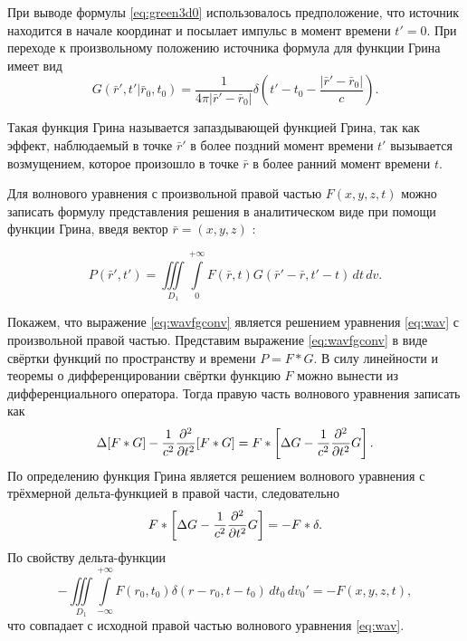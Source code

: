 \documentclass[a4paper, fontsize=14pt]{article}
\begin{document}
При выводе формулы \eqref{eq:green3d0} использовалось предположение,  что источник находится в начале координат  и посылает импульс в момент времени $t' = 0$. При переходе к произвольному положению источника 
формула для функции Грина имеет вид
\begin{equation}
	G(\bar{r}',t'|\bar{r}_0,t_0)= \frac{1}{4\pi|\bar{r}'-\bar{r}_0|}
	\delta\left(t'-t_0-\frac{|\bar{r}'-\bar{r}_0|}{c}\right).
\label{eq:green3d}
\end{equation}

	Такая функция Грина называется запаздывающей функцией Грина, так как эффект,
	наблюдаемый в точке $\bar{r}'$ в более поздний момент времени $t'$ вызывается
	возмущением,
	которое произошло в точке $\bar{r}$ в более ранний момент времени $t$.

	
	Для волнового уравнения с произвольной правой частью $F(x,y,z,t)$ можно
	записать формулу представления решения 
	в аналитическом виде при помощи функции Грина, введя вектор $\bar{r} = (x,y,z)$ \cite{vladimirov}:
	
	
	
	\begin{equation}
		P(\bar{r}',t')=\iiint\limits_{D_1} \int\limits_{0}^{+\infty}
		F(\bar{r},t) G(\bar{r}' - \bar{r},t'- t)\,dt\,dv.
		\label{eq:wavfgconv}
	\end{equation}
	
	Покажем, что выражение \eqref{eq:wavfgconv} является решением уравнения \eqref{eq:wav} с произвольной правой частью.
	Представим выражение \eqref{eq:wavfgconv} в виде свёртки функций по пространству и времени $P = F*G$. В силу линейности  и теоремы о дифференцировании свёртки функцию $F$ можно вынести из дифференциального оператора.
	Тогда правую часть волнового уравнения записать как 
	\begin{equation}
		\Delta [F*G] -\frac{1}{c^2} \diff[2]{}{t} [F*G] = F*\left[\Delta G -\frac{1}{c^2} \diff[2]{}{t} 
		G\right].
	\end{equation}
	По определению функция Грина является решением волнового уравнения с трёхмерной дельта-функцией в правой части, следовательно
	\begin{equation*}
		F*\left[\Delta G -\frac{1}{c^2} \diff[2]{}{t} G\right] = -F * \delta.
	\end{equation*}
	По свойству дельта-функции 
	\begin{equation}
		-\iiint\limits_{D_1} \int\limits_{-\infty}^{+\infty}
		F(r_0,t_0) \delta({r} - {r}_0,t- t_0)\,dt_0\,dv_0' = -F(x,y,z,t),
	\end{equation}
	что совпадает с исходной правой частью волнового уравнения   \eqref{eq:wav}.
	
\end{document}
